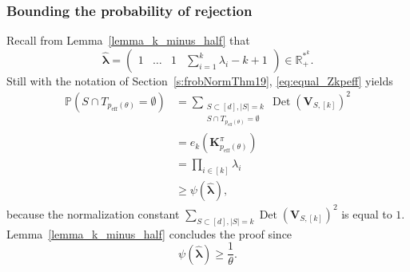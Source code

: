 \documentclass[twoside,11pt]{book}
\numberwithin{theorem}{chapter}
\numberwithin{definition}{chapter}
\numberwithin{proposition}{chapter}
\numberwithin{corollary}{chapter}
\numberwithin{example}{chapter}
\numberwithin{lemma}{chapter}
\numberwithin{assumption}{chapter}
\numberwithin{equation}{chapter}
\numberwithin{figure}{chapter}
\DeclareMathOperator{\Det}{Det}
\DeclareMathOperator{\eff}{\mathrm{eff}}
\begin{document}
\subsubsection{Bounding the probability of rejection}
Recall from Lemma~\ref{lemma_k_minus_half} that
$$
\hat{\bm{\lambda}} = \begin{pmatrix} 1 &\dots &1&\sum_{i=1}^k {\lambda_i}-k+1\end{pmatrix}\in\mathbb{R}_{+}^{*^{k}}.$$
Still with the notation of Section~\ref{s:frobNormThm19}, \eqref{eq:equal_Zkpeff} yields
\begin{align}
    \mathbb{P}(S \cap T_{p_{\eff}(\theta)} = \emptyset) &= \sum\limits_{\substack{S \subset [d], |S| = k\\ S \cap T_{p_{\eff}(\theta)} = \emptyset}} \Det(\bm{V}_{S,[k]})^{2} \nonumber\\
    &= e_k(\bm{K}^\pi_{p_{\eff}(\theta)})\\
    &= \prod_{i \in [k]}\lambda_{i} \nonumber\\
    &\geq \psi(\hat{\bm{\lambda}}),
\end{align}
because the normalization constant $\displaystyle \sum\limits_{S \subset [d], |S| = k} \Det(\bm{V}_{S,[k]})^{2}$ is equal to $1$.
Lemma~\ref{lemma_k_minus_half} concludes the proof since
\begin{equation}
	\psi(\hat{\bm{\lambda}}) \geq \frac{1}{\theta}.
\end{equation}


\end{document}
